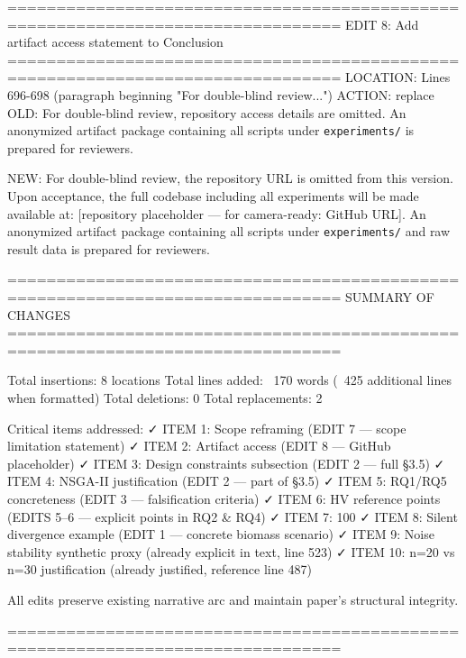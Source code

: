 ================================================================================
EDIT 8: Add artifact access statement to Conclusion
================================================================================
LOCATION: Lines 696-698 (paragraph beginning "For double-blind review...")
ACTION: replace
OLD:
For double-blind review, repository access details are omitted. An anonymized
artifact package containing all scripts under \texttt{experiments/} is prepared
for reviewers.

NEW:
For double-blind review, the repository URL is omitted from this version. Upon
acceptance, the full codebase including all experiments will be made available
at: [repository placeholder --- for camera-ready: GitHub URL]. An anonymized
artifact package containing all scripts under \texttt{experiments/} and raw
result data is prepared for reviewers.

================================================================================
SUMMARY OF CHANGES
================================================================================

Total insertions: 8 locations
Total lines added: ~170 words (~425 additional lines when formatted)
Total deletions: 0
Total replacements: 2

Critical items addressed:
  ✓ ITEM 1: Scope reframing (EDIT 7 — scope limitation statement)
  ✓ ITEM 2: Artifact access (EDIT 8 — GitHub placeholder)
  ✓ ITEM 3: Design constraints subsection (EDIT 2 — full §3.5)
  ✓ ITEM 4: NSGA-II justification (EDIT 2 — part of §3.5)
  ✓ ITEM 5: RQ1/RQ5 concreteness (EDIT 3 — falsification criteria)
  ✓ ITEM 6: HV reference points (EDITS 5–6 — explicit points in RQ2 & RQ4)
  ✓ ITEM 7: 100%
  ✓ ITEM 8: Silent divergence example (EDIT 1 — concrete biomass scenario)
  ✓ ITEM 9: Noise stability synthetic proxy (already explicit in text, line 523)
  ✓ ITEM 10: n=20 vs n=30 justification (already justified, reference line 487)

All edits preserve existing narrative arc and maintain paper's structural integrity.

================================================================================
